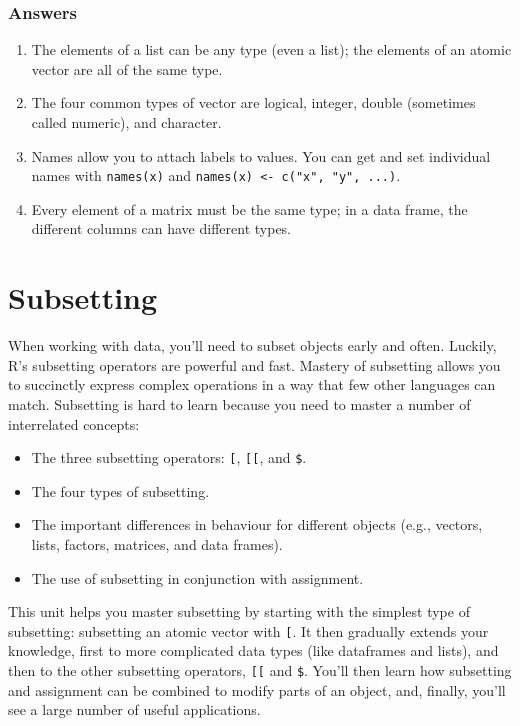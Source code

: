 \documentclass[]{book}
\begin{document}
\hypertarget{data-structure-answers}{\subsection{Answers}\label{data-structure-answers}}

\begin{enumerate}
\def\labelenumi{\arabic{enumi}.}
\item
  The elements of a list can be any type (even a list); the elements of
  an atomic vector are all of the same type.
\item
  The four common types of vector are logical, integer, double
  (sometimes called numeric), and character.
\item
  Names allow you to attach labels to values. You can get and set
  individual names with \texttt{names(x)} and
  \texttt{names(x)\ \textless{}-\ c("x",\ "y",\ ...)}.
\item
  Every element of a matrix must be the same type; in a data frame, the
  different columns can have different types.
\end{enumerate}

\chapter{Subsetting}\label{subsetting}

When working with data, you'll need to subset objects early and often.
Luckily, R's subsetting operators are powerful and fast. Mastery of
subsetting allows you to succinctly express complex operations in a way
that few other languages can match. Subsetting is hard to learn because
you need to master a number of interrelated concepts:

\begin{itemize}
\item
  The three subsetting operators: \texttt{{[}}, \texttt{{[}{[}}, and
  \texttt{\$}.
\item
  The four types of subsetting.
\item
  The important differences in behaviour for different objects (e.g.,
  vectors, lists, factors, matrices, and data frames).
\item
  The use of subsetting in conjunction with assignment.
\end{itemize}

This unit helps you master subsetting by starting with the simplest type
of subsetting: subsetting an atomic vector with \texttt{{[}}. It then
gradually extends your knowledge, first to more complicated data types
(like dataframes and lists), and then to the other subsetting operators,
\texttt{{[}{[}} and \texttt{\$}. You'll then learn how subsetting and
assignment can be combined to modify parts of an object, and, finally,
you'll see a large number of useful applications.
\end{document}
